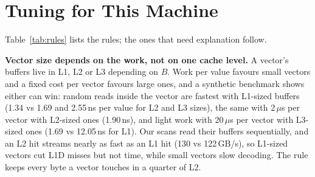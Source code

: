 \section{Tuning for This Machine}
Table~\ref{tab:rules} lists the rules; the ones that need explanation follow.

\textbf{Vector size depends on the work, not on one cache level.} A vector's buffers live in
L1, L2 or L3 depending on $B$. Work per value favours small vectors and a fixed cost per vector
favours large ones, and a synthetic benchmark shows either can win: random reads inside the
vector are fastest with L1-sized buffers (1.34 vs 1.69 and 2.55\,ns per value for L2 and L3
sizes), the same with 2\,$\mu$s per vector with L2-sized ones (1.90\,ns), and light work with
20\,$\mu$s per vector with L3-sized ones (1.69 vs 12.05\,ns for L1). Our scans read their buffers
sequentially, and an L2 hit streams nearly as fast as an L1 hit (130 vs 122\,GB/s), so L1-sized
vectors cut L1D misses but not time, while small vectors slow decoding. The rule keeps every byte
a vector touches in a quarter of L2.

